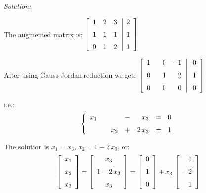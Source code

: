 \documentclass[12pt]{article}
\newcommand{\solution}[2]{\ifthenelse{\boolean{showsol}}%
{\vskip10pt\noindent\emph{Solution:}\vskip10pt #2}{\vskip #1}}
\begin{document}
\solution{2.5in}{\par
The augmented matrix is:
$\displaystyle{
\left [
\begin{array}{rrr} 1&2&3\\\noalign{\medskip}1&1&1
\\\noalign{\medskip}0&1&2
\end{array}\right.
\hskip -2pt
\left|
\begin{array}{r}
2\\\noalign{\medskip}1\\\noalign{\medskip}1
\end{array}
\right]
}$

After using Gauss-Jordan reduction we get:
$\displaystyle{
\left [
\begin{array}{rrrr} 
1&\phantom{-}0&-1\\
\noalign{\medskip}0&1&2\\
\noalign{\medskip}0&0&0
\end{array}\right.
\hskip -2pt
\left|
\hskip 2pt
\begin{array}{r}
0\\\noalign{\medskip}1\\\noalign{\medskip}0
\end{array}
\right]
}$

i.e.:
\[
\left \{\begin {array}{rrrrrrr} x_1&&&-&x_3&=&0\\
\noalign{\medskip}&&x_2&+&2\,x_3&=&1
\end {array}\right .
\]

The solution is $x_1 = x_3$, $x_2 = 1-2\,x_3$, or:
\[
\left [\begin {array}{r} x_{{1}}\\\noalign{\medskip}x_{{2}}
\\\noalign{\medskip}x_{{3}}\end {array}\right ]
=
\left [\begin {array}{c} 
x_{{3}}\\\noalign{\medskip}1-2\,x_{{3}}\\\noalign{\medskip}x_{{3}}
\end {array}\right ]
=
\left [\begin {array}{r} 0\\\noalign{\medskip}1\\\noalign{\medskip}0
\end {array}\right ]+x_{{3}}\,
\left [\begin {array}{r} 1\\\noalign{\medskip}-2\\\noalign{\medskip}1
\end {array}\right ]
\]

}
\end{document}
